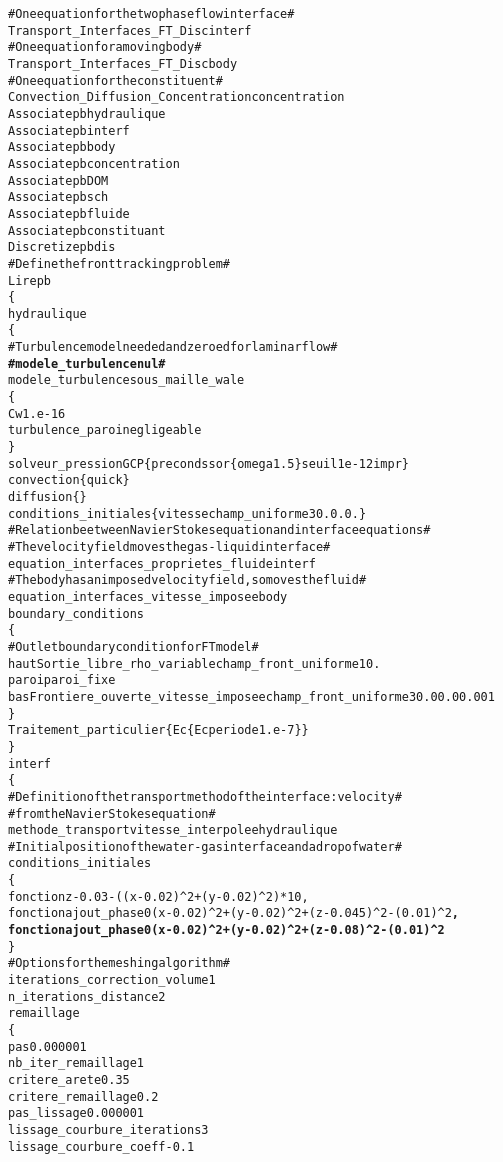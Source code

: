\begin{alltt}
# One equation for the two phase flow interface #
Transport_Interfaces_FT_Disc       interf
# One equation for a moving body #
Transport_Interfaces_FT_Disc       body
# One equation for the constituent #
Convection_Diffusion_Concentration concentration
Associate pb hydraulique
Associate pb interf
Associate pb body
Associate pb concentration
Associate pb DOM
Associate pb sch
Associate pb fluide
Associate pb constituant
Discretize pb dis
# Define the front tracking problem #
Lire pb
\{
    hydraulique
    \{
        # Turbulence model needed and zeroed for laminar flow #
        {\bf{# modele_turbulence nul #}}
        modele_turbulence sous_maille_wale
        \{
            Cw               1.e-16
            turbulence_paroi negligeable
        \}
        solveur_pression GCP \{ precond ssor \{ omega 1.5 \} seuil 1e-12 impr \}
        convection           \{ quick \}
        diffusion            \{ \}
        conditions_initiales \{ vitesse champ_uniforme 3 0. 0. 0. \}
        # Relation beetween Navier Stokes equation and interface equations #
        # The velocity field moves the gas-liquid interface #
        equation_interfaces_proprietes_fluide interf 
        # The body has an imposed velocity field, so moves the fluid #
        equation_interfaces_vitesse_imposee   body
        boundary_conditions
        \{
            # Outlet boundary condition for FT model #
            haut   Sortie_libre_rho_variable champ_front_uniforme 1 0.    
            paroi  paroi_fixe
            bas    Frontiere_ouverte_vitesse_imposee champ_front_uniforme 3 0.0 0.0 0.001
        \}
        Traitement_particulier \{ Ec \{ Ec periode 1.e-7 \} \}
    \}
    interf
    \{
        # Definition of the transport method of the interface: velocity #
        # from the Navier Stokes equation #
        methode_transport vitesse_interpolee hydraulique
        # Initial position of the water-gas interface and a drop of water #
        conditions_initiales 
        \{
            fonction z-0.03-((x-0.02)^2+(y-0.02)^2)*10 ,
            fonction ajout_phase0 (x-0.02)^2+(y-0.02)^2+(z-0.045)^2-(0.01)^2 {\bf{,}}
            {\bf{fonction ajout_phase0 (x-0.02)^2+(y-0.02)^2+(z-0.08)^2-(0.01)^2 }}
        \}
        # Options for the meshing algorithm #
        iterations_correction_volume 1
        n_iterations_distance 2
        remaillage 
        \{
            pas 0.000001
            nb_iter_remaillage 1
            critere_arete 0.35
            critere_remaillage 0.2
            pas_lissage 0.000001
            lissage_courbure_iterations 3
            lissage_courbure_coeff -0.1

\end{alltt}
